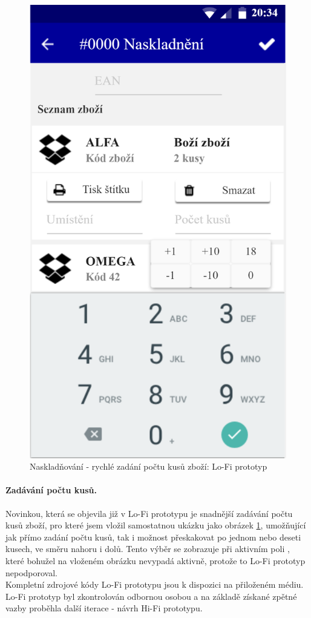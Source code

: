 \begin{figure}[h]
\includegraphics[height=0.6\textheight]{../png/axure/keyboard.png}
\caption{Naskladňování - rychlé zadání počtu kusů zboží: Lo-Fi prototyp} \label{picture:axure:keyboard}
\end{figure}

\paragraph{Zadávání počtu kusů.} Novinkou, která se objevila již v Lo-Fi prototypu je snadnější zadávání počtu kusů zboží, pro které jsem vložil samostatnou ukázku jako obrázek \ref{picture:axure:keyboard}, umožňující jak přímo zadání počtu kusů, tak i možnost přeskakovat po jednom nebo deseti kusech, ve směru nahoru i dolů. Tento výběr se zobrazuje při aktivním poli , které bohužel na vloženém obrázku nevypadá aktivně, protože to Lo-Fi prototyp nepodporoval.\\

Kompletní zdrojové kódy Lo-Fi prototypu jsou k dispozici na přiloženém médiu.\\
Lo-Fi prototyp byl zkontrolován odbornou osobou a na základě získané zpětné vazby proběhla další iterace - návrh Hi-Fi prototypu.\\
